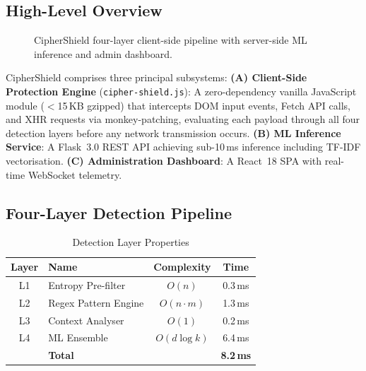 \documentclass[10pt,twocolumn]{article}
\begin{document}
\subsection{High-Level Overview}

\begin{figure}[H]
  \centering
  \caption{CipherShield four-layer client-side pipeline with server-side
           ML inference and admin dashboard.}
  \label{fig:arch}
\end{figure}

CipherShield comprises three principal subsystems:
\textbf{(A) Client-Side Protection Engine} (\texttt{cipher-shield.js}):
A zero-dependency vanilla JavaScript module ($<$15\,KB gzipped) that
intercepts DOM input events, Fetch API calls, and XHR requests via
monkey-patching, evaluating each payload through all four detection layers
before any network transmission occurs.
\textbf{(B) ML Inference Service}: A Flask~3.0 REST API achieving
sub-10\,ms inference including TF-IDF vectorisation.
\textbf{(C) Administration Dashboard}: A React~18 SPA with real-time
WebSocket telemetry.

\subsection{Four-Layer Detection Pipeline}

\begin{table}[H]
\centering
\caption{Detection Layer Properties}
\label{tab:layers}
\small
\setlength{\tabcolsep}{4pt}
\begin{tabular}{@{}clcc@{}}
\toprule
\textbf{Layer} & \textbf{Name} & \textbf{Complexity} & \textbf{Time} \\
\midrule
L1 & Entropy Pre-filter   & $O(n)$         & 0.3\,ms \\
L2 & Regex Pattern Engine & $O(n{\cdot}m)$ & 1.3\,ms \\
L3 & Context Analyser     & $O(1)$         & 0.2\,ms \\
L4 & ML Ensemble          & $O(d\log k)$   & 6.4\,ms \\
\midrule
   & \textbf{Total}       &                & \textbf{8.2\,ms} \\
\bottomrule
\end{tabular}
\end{table}
\end{document}

